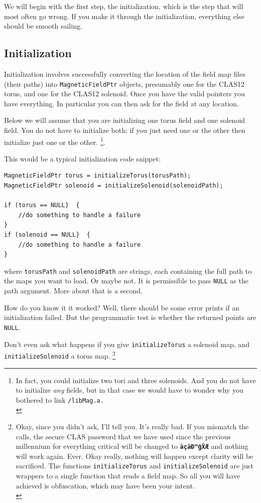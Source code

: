 \documentclass{article}
\begin{document}
We will begin with the first step, the initialization, which is the step that will most often go wrong. If you make it through the initialization, everything else should be smooth sailing.
\subsection{Initialization}

Initialization involves successfully converting the location of the field map files (their paths) into  \texttt{MagneticFieldPtr} objects, presumably one for the CLAS12 torus, and one for the CLAS12 solenoid. Once you have the valid pointers you have everything. In particular you can then ask for the field at any location.

Below we will assume that you are initializing one torus field and one solenoid field. You do not have to initialize both; if you just need one or the other then initialize just one or the other. \footnote{In fact, you could initialize two tori and three solenoids. And you do not have to initialize \textit{any} fields, but in that case we would have to wonder why you bothered to link \texttt{/libMag.a.\\}}. 

This would be a typical initialization code snippet:

\begin{verbatim} 
MagneticFieldPtr torus = initializeTorus(torusPath);
MagneticFieldPtr solenoid = initializeSolenoid(solenoidPath);

if (torus == NULL}  {
    //do something to handle a failure
}
if (solenoid == NULL}  {
    //do something to handle a failure
}

\end{verbatim}

where \texttt{torusPath} and \texttt{solenoidPath} are strings, each containing the full path to the maps you want to load. Or maybe not. It is permissible to pass \texttt{NULL} as the path argument. More about that is a second. 

How do you know it it worked? Well, there  should be some error prints if an initialization failed. But the programmatic test is whether the returned points are \texttt{NULL}. 

Don't even ask what happens if you give \texttt{initializeTorus} a solenoid map, and \texttt{initializeSolenoid}  a torus map. \footnote{Okay, since you didn't ask, I'll tell you. It's really bad. If you mismatch the calls, the secure CLAS password that we have used since the previous millennium for everything critical will be changed to \textbf{\texttt{äçäĐ™ǧẌÆ}} and nothing will work again. Ever. Okay really, nothing will happen except clarity will be sacrificed. The functions \texttt{initializeTorus} and \texttt{initializeSolenoid} are just wrappers to a single function that reads a field map. So all you will have achieved is obfuscation, which may have been your intent.\\}
\end{document}
